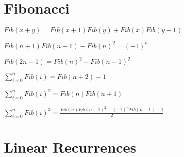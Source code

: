 \section{Fibonacci}
\newcommand{\Fib}{\mathit{Fib}}
$\Fib(x + y) = \Fib(x + 1) \Fib(y) + \Fib(x) \Fib(y - 1)$

$\Fib(n+1)\Fib(n-1) - \Fib(n)^2 = (-1)^n$

$\Fib(2n-1) = \Fib(n)^2 - \Fib(n-1)^2$

$ \sum_{i=0}^{n} \Fib(i) = \Fib(n+2) - 1$

$ \sum_{i=0}^{n} \Fib(i)^2 = \Fib(n)\Fib(n+1)$

$ \sum_{i=0}^{n} \Fib(i)^3 = \frac{\Fib(n)\Fib(n+1)^2 - (-1)^n\Fib(n-1) + 1}{2}$

\section{Linear Recurrences}
